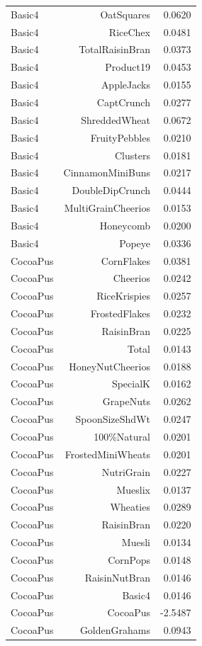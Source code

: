 \begin{longtable}{@{}lrr@{}}
Basic4 & OatSquares & 0.0620 \\
Basic4 & RiceChex & 0.0481 \\
Basic4 & TotalRaisinBran & 0.0373 \\
Basic4 & Product19 & 0.0453 \\
Basic4 & AppleJacks & 0.0155 \\
Basic4 & CaptCrunch & 0.0277 \\
Basic4 & ShreddedWheat & 0.0672 \\
Basic4 & FruityPebbles & 0.0210 \\
Basic4 & Clusters & 0.0181 \\
Basic4 & CinnamonMiniBuns & 0.0217 \\
Basic4 & DoubleDipCrunch & 0.0444 \\
Basic4 & MultiGrainCheerios & 0.0153 \\
Basic4 & Honeycomb & 0.0200 \\
Basic4 & Popeye & 0.0336 \\
CocoaPus & CornFlakes & 0.0381 \\
CocoaPus & Cheerios & 0.0242 \\
CocoaPus & RiceKrispies & 0.0257 \\
CocoaPus & FrostedFlakes & 0.0232 \\
CocoaPus & RaisinBran & 0.0225 \\
CocoaPus & Total & 0.0143 \\
CocoaPus & HoneyNutCheerios & 0.0188 \\
CocoaPus & SpecialK & 0.0162 \\
CocoaPus & GrapeNuts & 0.0262 \\
CocoaPus & SpoonSizeShdWt & 0.0247 \\
CocoaPus & 100\%Natural & 0.0201 \\
CocoaPus & FrostedMiniWheats & 0.0201 \\
CocoaPus & NutriGrain & 0.0227 \\
CocoaPus & Mueslix & 0.0137 \\
CocoaPus & Wheaties & 0.0289 \\
CocoaPus & RaisinBran & 0.0220 \\
CocoaPus & Muesli & 0.0134 \\
CocoaPus & CornPops & 0.0148 \\
CocoaPus & RaisinNutBran & 0.0146 \\
CocoaPus & Basic4 & 0.0146 \\
CocoaPus & CocoaPus & -2.5487 \\
CocoaPus & GoldenGrahams & 0.0943 \\

\end{longtable}
